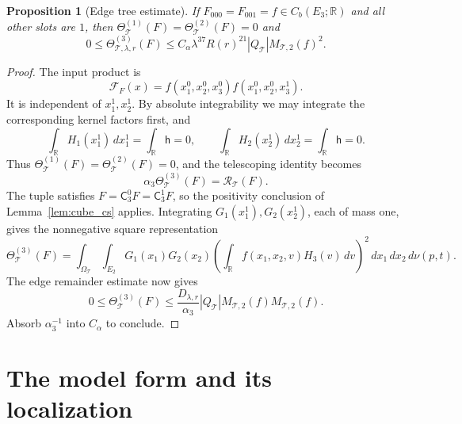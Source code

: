 \documentclass[12pt,reqno]{amsart}
\theoremstyle{plain}
\newtheorem{proposition}[theorem]{Proposition}
\theoremstyle{definition}
\theoremstyle{remark}
\numberwithin{equation}{section}
\newcommand{\R}{\mathbb R}
\newcommand{\T}{\mathcal T}
\newcommand{\h}{\mathsf h}
\newcommand{\dd}{\,d}
\begin{document}
\begin{proposition}[Edge tree estimate]\label{prop:edge_tree}
If $F_{000}=F_{001}=f\in C_b(E_3;\R)$ and all other slots are $1$,
then $\Theta^{(1)}_\T(F)=\Theta^{(2)}_\T(F)=0$ and
\[
 0\le\Theta^{(3)}_{\T,\lambda,r}(F)
 \le C_\alpha\lambda^{37}R(r)^{21}|Q_\T|M_{\T,2}(f)^2.
\]
\end{proposition}
\begin{proof}
The input product is
\[
 \mathcal F_F(x)=f(x_1^0,x_2^0,x_3^0)
                         f(x_1^0,x_2^0,x_3^1).
\]
It is independent of $x_1^1,x_2^1$. By absolute integrability we
may integrate the corresponding kernel factors first, and
\[
 \int_\R H_1(x_1^1)\dd x_1^1=\int_\R\h=0,\qquad
 \int_\R H_2(x_2^1)\dd x_2^1=\int_\R\h=0.
\]
Thus $\Theta^{(1)}_\T(F)=\Theta^{(2)}_\T(F)=0$, and the
telescoping identity becomes
\[
 \alpha_3\Theta^{(3)}_\T(F)=\mathcal R_\T(F).
\]
The tuple satisfies $F=\mathsf C_3^0F=\mathsf C_3^1F$, so the
positivity conclusion of Lemma~\ref{lem:cube_cs} applies.
Integrating $G_1(x_1^1),G_2(x_2^1)$, each of mass one,
gives the nonnegative square representation
\[
 \Theta^{(3)}_\T(F)
 =\int_{\Omega_\T}\int_{E_2}G_1(x_1)G_2(x_2)
       \left(\int_\R f(x_1,x_2,v)H_3(v)\dd v\right)^2
                     \dd x_1\dd x_2\,d\nu(p,t).
\]
The edge remainder estimate now gives
\[
 0\le\Theta^{(3)}_\T(F)
    \le\frac{D_{\lambda,r}}{\alpha_3}|Q_\T|
               M_{\T,2}(f)M_{\T,2}(f).
\]
Absorb $\alpha_3^{-1}$ into $C_\alpha$ to conclude.
\end{proof}

\section{The model form and its localization}
\end{document}

